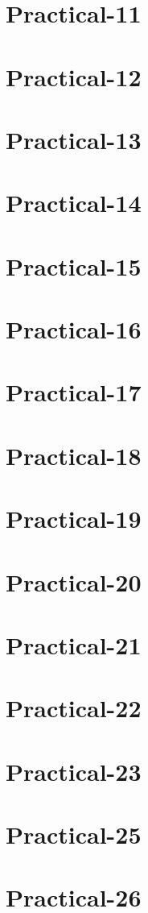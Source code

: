 \documentclass[12pt]{report}
\begin{document}
\chapter{Practical-11}

\chapter{Practical-12}

\chapter{Practical-13}

\chapter{Practical-14}

\chapter{Practical-15}

\chapter{Practical-16}

\chapter{Practical-17}

\chapter{Practical-18}

\chapter{Practical-19}

\chapter{Practical-20}

\chapter{Practical-21}

\chapter{Practical-22}

\chapter{Practical-23}

\chapter{Practical-25}

\chapter{Practical-26}



%
\end{document}

